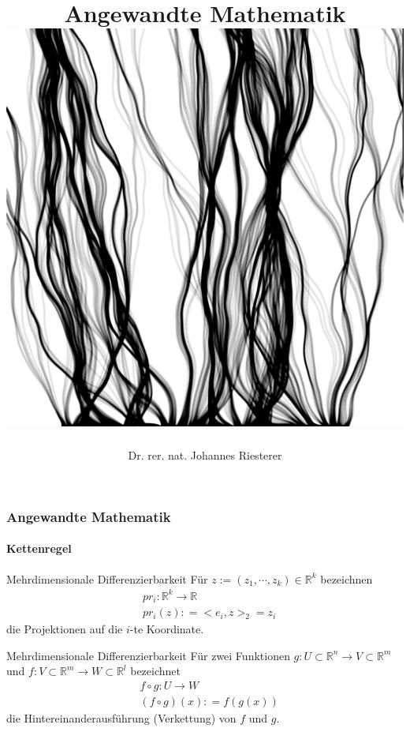 \documentclass{beamer}
\begin{document}
\title[Angewandte Mathematik] %
{Angewandte Mathematik
\\
\includegraphics[scale=0.15]{images/cover}
}
\subtitle{}
\author[Dr. Johannes Riesterer] %
{Dr.  rer. nat. Johannes Riesterer}

\date[KPT 2004] %
{}

\subject{Angewandte Mathematik}



\begin{frame}
    \frametitle{Angewandte Mathematik}
\framesubtitle{Kettenregel}

    \begin{block}{Mehrdimensionale Differenzierbarkeit}
Für $z:= (z_1, \cdots ,z_k) \in \mathbb{R}^k$ bezeichnen 
\begin{align*}
& pr_i : \mathbb{R}^k \to \mathbb{R} \\
& pr_i(z): = <e_i, z>_2 = z_i
\end{align*}
die Projektionen auf die $i$-te Koordinate.
\end{block}


    \begin{block}{Mehrdimensionale Differenzierbarkeit}
Für zwei Funktionen  $g: U \subset \mathbb{R}^n \to V  \subset \mathbb{R}^m$ und $f: V \subset \mathbb{R}^m \to W  \subset \mathbb{R}^l$ bezeichnet 
\begin{align*}
& f \circ g: U \to W \\
& (f \circ g)(x) : = f (g(x))
\end{align*}
die Hintereinanderausführung (Verkettung) von $f$ und $g$.
\end{block}

 \end{frame}
\end{document}
